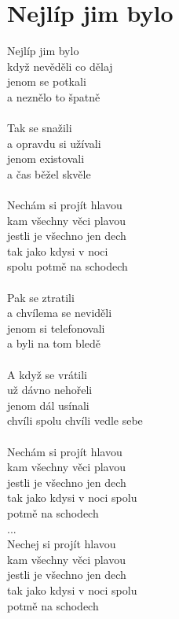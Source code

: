 \section{Nejlíp jim bylo}
Nejlíp jim bylo\\
když nevěděli co dělaj\\
jenom se potkali\\
a neznělo to špatně\\
\\
Tak se snažili\\
a opravdu si užívali\\
jenom existovali\\
a čas běžel skvěle\\
\\
Nechám si projít hlavou\\
kam všechny věci plavou\\
jestli je všechno jen dech\\
tak jako kdysi v noci\\
spolu potmě na schodech\\
\\
Pak se ztratili\\
a chvílema se neviděli\\
jenom si telefonovali\\
a byli na tom bledě\\
\\
A když se vrátili\\
už dávno nehořeli\\
jenom dál usínali\\
chvíli spolu chvíli vedle sebe\\
\\
Nechám si projít hlavou\\
kam všechny věci plavou\\
jestli je všechno jen dech\\
tak jako kdysi v noci spolu\\
potmě na schodech\\
...\\
Nechej si projít hlavou\\
kam všechny věci plavou\\
jestli je všechno jen dech\\
tak jako kdysi v noci spolu\\
potmě na schodech\\